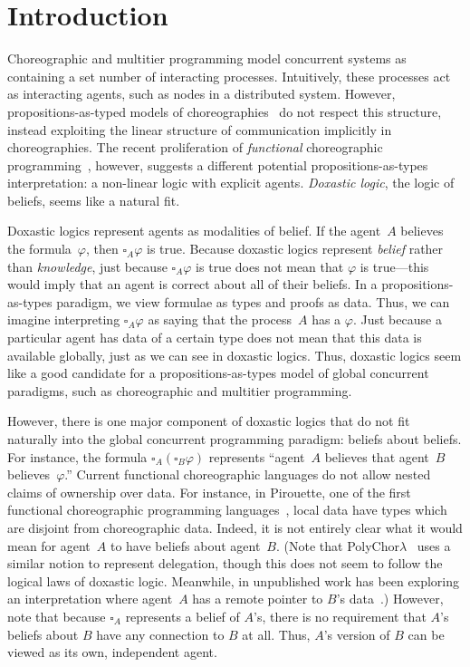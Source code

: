 \section{Introduction}
\label{sec:introduction}

Choreographic and multitier programming model concurrent systems as containing a set number of interacting processes.
Intuitively, these processes act as interacting agents, such as nodes in a distributed system.
However, propositions-as-typed models of choreographies~\cite{CarboneMS14} do not respect this structure, instead exploiting the linear structure of communication implicitly in choreographies.
The recent proliferation of \emph{functional} choreographic programming~\cite{HirschG22,GraversenHM23,CruzFilipeGLMP21}, however, suggests a different potential propositions-as-types interpretation: a non-linear logic with explicit agents.
\emph{Doxastic logic}, the logic of beliefs, seems like a natural fit.

Doxastic logics represent agents as modalities of belief.
If the agent~$A$ believes the formula~$\varphi$, then $\square_A \varphi$ is true.
Because doxastic logics represent \emph{belief} rather than \emph{knowledge}, just because $\square_A \varphi$ is true does not mean that $\varphi$ is true---this would imply that an agent is correct about all of their beliefs.
In a propositions-as-types paradigm, we view formulae as types and proofs as data.
Thus, we can imagine interpreting $\square_A \varphi$ as saying that the process~$A$ has a $\varphi$.
Just because a particular agent has data of a certain type does not mean that this data is available globally, just as we can see in doxastic logics.
Thus, doxastic logics seem like a good candidate for a propositions-as-types model of global concurrent paradigms, such as choreographic and multitier programming.

However, there is one major component of doxastic logics that do not fit naturally into the global concurrent programming paradigm: beliefs about beliefs.
For instance, the formula $\square_A (\square_B \varphi)$ represents ``agent~$A$ believes that agent~$B$ believes~$\varphi$.''
Current functional choreographic languages do not allow nested claims of ownership over data.
For instance, in Pirouette, one of the first functional choreographic programming languages~\cite{HirschG22}, local data have types which are disjoint from choreographic data.
Indeed, it is not entirely clear what it would mean for agent~$A$ to have beliefs about agent~$B$.
(Note that PolyChor$\lambda$~\cite{GraversenHM23} uses a similar notion to represent delegation, though this does not seem to follow the logical laws of doxastic logic.
Meanwhile, in unpublished work \citeauthor{Kavvos24} has been exploring an interpretation where agent~$A$ has a remote pointer to $B$'s data~\cite{Kavvos24}.)
However, note that because $\square_A$ represents a belief of $A$'s, there is no requirement that $A$'s beliefs about $B$ have any connection to $B$ at all.
Thus, $A$'s version of $B$ can be viewed as its own, independent agent.

